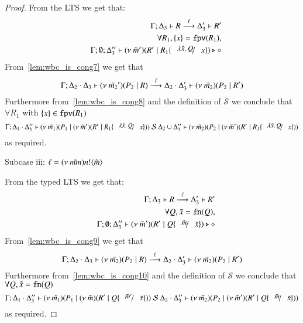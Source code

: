 \begin{proof}
	\noi From the LTS we get that:
	\begin{eqnarray}
		& &	\horel{\Gamma}{\Delta_3}{R}{\by{\ell}}{\Delta_3'}{R'}
			\label{lem:wbc_is_cong7}\\
		& & 	\forall R_1, \set{x} = \fpv{R_1},
			\nonumber\\
		& &	\Gamma; \emptyset; \Delta_3'' \proves \newsp{\tilde{m}'}{R' \Par R_1 \subst{\abs{\tilde{x}}{Q}}{x}} \hastype \Proc
			\label{lem:wbc_is_cong8}
	\end{eqnarray}
%
	\noi From~\ref{lem:wbc_is_cong7} we get that
	\[
		\Gamma; \Delta_2 \cdot \Delta_3 \vdash (\nu\ \tilde{m_2}')(P_2 \;|\; R) \stackrel{\ell}{\longrightarrow} \Delta_2 \cdot \Delta_3' \vdash (\nu\ \tilde{m_2})(P_2 \;|\; R')
	\]
	\noi Furthermore from~\ref{lem:wbc_is_cong8} and the definition of $\mathcal{S}$ we conclude that
	$\forall R_1$ with $\{x\} \in \mathtt{fpv}(R_1)$
	\[
		\horel{\Gamma}{\Delta_1 \cat \Delta_3''}{\newsp{\tilde{m_1}}{P_1 \Par \newsp{\tilde{m}'}{R' \Par R_1 \subst{\abs{\tilde{x}}{Q}}{x}}}}
		{\ \mathcal{S}\ }
		{\Delta_2 \cup \Delta_3''}{\newsp{\tilde{m_2}}{P_2 \Par \newsp{\tilde{m}'}{R' \Par R_1 \subst{\abs{\tilde{x}}{Q}}{x}}}}
	\]
	\noi as required.

	\noi Subcase iii: $\ell = (\nu\ \tilde{mm}) n ! \langle \tilde{m} \rangle$

	\noi From the typed LTS we get that:
	\begin{eqnarray}
		& &	\horel{\Gamma}{\Delta_3}{R}{\by{\ell}}{\Delta_3'}{R'}
			\label{lem:wbc_is_cong9} \\
		& &	\forall Q, \tilde{x} = \fn{Q}, \nonumber\\
		& &	\Gamma; \emptyset; \Delta_3'' \proves \newsp{\tilde{m}'}{R' \Par Q \subst{\tilde{m}}{\tilde{x}}} \hastype \Proc
			\label{lem:wbc_is_cong10}
	\end{eqnarray}
%
	\noi From~\ref{lem:wbc_is_cong9} we get that
	\[
		\Gamma; \Delta_2 \cdot \Delta_3 \vdash (\nu\ \tilde{m_2})(P_2 \;|\; R) \stackrel{\ell}{\longrightarrow} \Delta_2 \cdot \Delta_3' \vdash (\nu\ \tilde{m_2})(P_2 \;|\; R')
	\]
	\noi Furthermore from~\ref{lem:wbc_is_cong10} and the definition of $\mathcal{S}$ we conclude that
	$\forall Q, \tilde{x} = \mathtt{fn}(Q)$
	\[
		\horel{\Gamma}{\Delta_1 \cat \Delta_3''}{\newsp{\tilde{m_1}}{P_1 \Par \newsp{\tilde{m}}{R' \Par Q \subst{\tilde{m}'}{\tilde{x}}}}}
		{\ \mathcal{S}\ }
		{\Delta_2 \cat \Delta_3''}{\newsp{\tilde{m_2}}{P_2 \Par \newsp{\tilde{m}'}{R' \Par Q \subst{\tilde{m}}{\tilde{x}}}}}
	\]
	\noi as required.




\end{proof}

